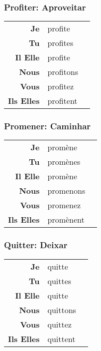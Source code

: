\documentclass{subfiles}
\begin{document}
\begin{multicols*}{3}
        \subsubsection{Profiter: Aproveitar}
            \begin{tabular}{r l r}
                \textbf{Je}        & profite   &\\
                \textbf{Tu}        & profites  &\\
                \textbf{Il Elle}   & profite   &\\
                \textbf{Nous}      & profitons &\\
                \textbf{Vous}      & profitez  &\\
                \textbf{Ils Elles} & profitent &
            \end{tabular}

        \subsubsection{Promener: Caminhar}
            \begin{tabular}{r l r}
                \textbf{Je}        & promène   &\\
                \textbf{Tu}        & promènes  &\\
                \textbf{Il Elle}   & promène   &\\
                \textbf{Nous}      & promenons &\\
                \textbf{Vous}      & promenez  &\\
                \textbf{Ils Elles} & promènent &
            \end{tabular}

        \subsubsection{Quitter: Deixar}
            \begin{tabular}{r l r}
                \textbf{Je}        & quitte   &\\
                \textbf{Tu}        & quittes  &\\
                \textbf{Il Elle}   & quitte   &\\
                \textbf{Nous}      & quittons &\\
                \textbf{Vous}      & quittez  &\\
                \textbf{Ils Elles} & quittent &
            \end{tabular}


\end{multicols*}
\end{document}
